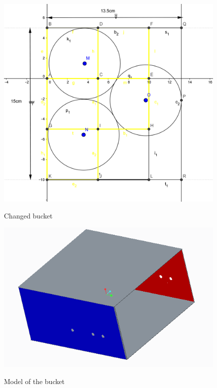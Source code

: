 \begin{itemize}
\begin{figure}[H]
	\begin{minipage}[h]{0.55\linewidth}
		{\includegraphics[scale=0.15]{days_L/Lift+bucket/images/03}}
		\caption{Changed bucket}
	\end{minipage}
	\hfill
	\begin{minipage}[h]{0.55\linewidth}
		{\includegraphics[scale=0.5]{days_L/Lift+bucket/images/06}}
		\caption{Model of the bucket}
	\end{minipage}
\end{figure}


\end{itemize}
